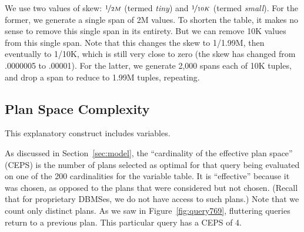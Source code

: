 \documentclass[prodmode,acmtods]{acmsmall}
\begin{document}
We use two values of skew: $\nicefrac{1}{2M}$ (termed {\em tiny}) and
$\nicefrac{1}{10K}$ (termed {\em small}).
For the former, we generate a single span of 2M values.  To shorten the
table, it makes no sense to remove this single span in its entirety. But we
can remove 10K values from this single span.  Note that this changes the
skew to 1/1.99M, then eventually to 1/10K, which is still very close to zero
(the skew has changed from .0000005 to .00001).
For the latter, we generate 2,000 spans each of 10K tuples, and drop a span
to reduce to 1.99M tuples, repeating.

\subsection{Plan Space Complexity}\label{sec:discontinuity}

This explanatory construct includes  variables.

As discussed in Section~\ref{sec:model}, the ``cardinality of the effective plan
space'' (CEPS) is the number of plans selected as optimal for that query
being evaluated on one of the 200 cardinalities for the variable table. It
is ``effective'' because it was chosen, as opposed to the
plans that were considered but not chosen. (Recall that for proprietary
\hbox{DBMSes}, we do not have access to such plans.) Note that we count only
distinct plans. As we saw in Figure~\ref{fig:query769}, fluttering queries
return to a previous plan. This particular query has a CEPS of 4.
\end{document}

